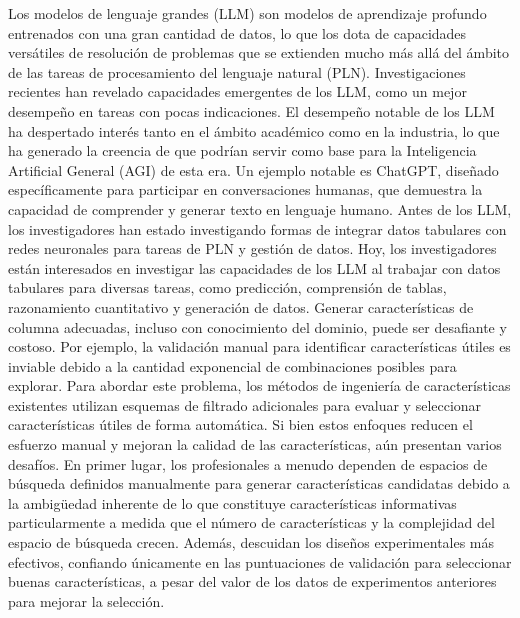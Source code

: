 Los modelos de lenguaje grandes (LLM) son modelos de aprendizaje profundo entrenados con una gran cantidad de datos, lo que los dota de capacidades versátiles de resolución de problemas que se extienden mucho más allá del ámbito de las tareas de procesamiento del lenguaje natural (PLN). Investigaciones recientes han revelado capacidades emergentes de los LLM, como un mejor desempeño en tareas con pocas indicaciones. El desempeño notable de los LLM ha despertado interés tanto en el ámbito académico como en la industria, lo que ha generado la creencia de que podrían servir como base para la Inteligencia Artificial General (AGI) de esta era. Un ejemplo notable es ChatGPT, diseñado específicamente para participar en conversaciones humanas, que demuestra la capacidad de comprender y generar texto en lenguaje humano.
Antes de los LLM, los investigadores han estado investigando formas de integrar datos tabulares con redes neuronales para tareas de PLN y gestión de datos. Hoy, los investigadores están interesados en investigar las capacidades de los LLM al trabajar con datos tabulares para diversas tareas, como predicción, comprensión de tablas, razonamiento cuantitativo y generación de datos. 
Generar características de columna adecuadas, incluso con conocimiento del dominio, puede ser desafiante y costoso. Por ejemplo, la validación manual para identificar características útiles es inviable debido a la cantidad exponencial de combinaciones posibles para explorar. Para abordar este problema, los métodos de ingeniería de características existentes utilizan esquemas de filtrado adicionales para evaluar y seleccionar características útiles de forma automática. Si bien estos enfoques reducen el esfuerzo manual y mejoran la calidad de las características, aún presentan varios desafíos. En primer lugar, los profesionales a menudo dependen de espacios de búsqueda definidos manualmente para generar características candidatas debido a la ambigüedad inherente de lo que constituye características informativas particularmente a medida que el número de características y la complejidad del espacio de búsqueda crecen. Además, descuidan los diseños experimentales más efectivos, confiando únicamente en las puntuaciones de validación para seleccionar buenas características, a pesar del valor de los datos de experimentos anteriores para mejorar la selección. 

